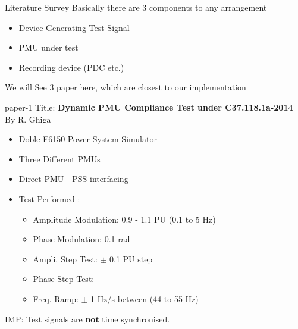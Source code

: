 \documentclass{beamer}
\begin{document}

\begin{frame}{Literature Survey}
Basically there are 3 components to any arrangement
\begin{itemize}
\item Device Generating Test Signal
\item PMU under test
\item Recording device (PDC etc.)
\end{itemize}

We will See 3 paper here, which are closest to our implementation
\end{frame}

\begin{frame}{paper-1}
Title: \textbf{Dynamic PMU Compliance Test under C37.118.1a-2014} By R. Ghiga
\begin{itemize}
\item Doble F6150 Power System Simulator
\item Three Different PMUs
\item Direct PMU - PSS interfacing
\item Test Performed \cite{Paper:ghiga} : 

\begin{itemize}
	\item Amplitude Modulation: 0.9 - 1.1 PU (\@ 0.1 to 5 Hz)
	\item Phase Modulation: 0.1 rad
	\item Ampli. Step Test: $\pm$ 0.1 PU step
	\item Phase Step Test: 
	\item Freq. Ramp: $\pm$ 1 Hz/s between (44 to 55 Hz)
\end{itemize}

\end{itemize}
IMP: Test signals are \textbf{not} time synchronised.
\end{frame}
\end{document}
